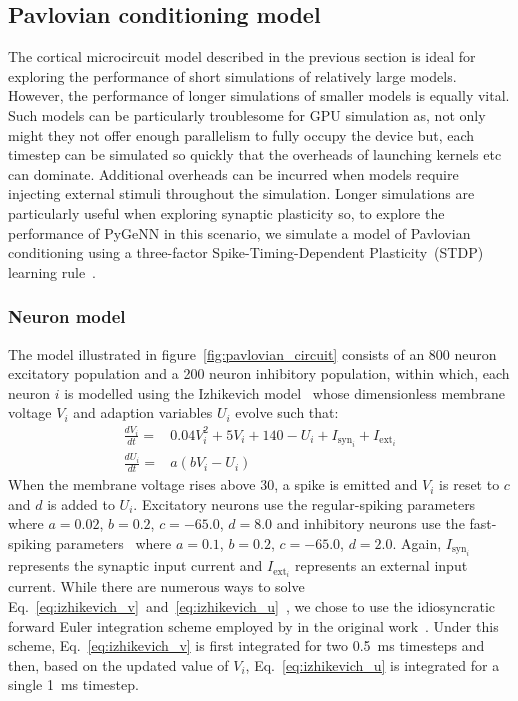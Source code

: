 \documentclass[utf8]{frontiersSCNS} %
\newcommand{\todo}[1]{\textbf{\textsc{\textcolor{red}{(TODO: #1)}}}}
\begin{document}
\subsection{Pavlovian conditioning model}
\label{sec:methods/izhikevich}
The cortical microcircuit model described in the previous section is ideal for exploring the performance of short simulations of relatively large models.
However, the performance of longer simulations of smaller models is equally vital.
Such models can be particularly troublesome for GPU simulation as, not only might they not offer enough parallelism to fully occupy the device but, each timestep can be simulated so quickly that the overheads of launching kernels etc can dominate.
Additional overheads can be incurred when models require injecting external stimuli throughout the simulation.
Longer simulations are particularly useful when exploring synaptic plasticity so, to explore the performance of PyGeNN in this scenario, we simulate a model of Pavlovian conditioning using a three-factor Spike-Timing-Dependent Plasticity~(STDP) learning rule~\citep{Izhikevich2007}.

\subsubsection{Neuron model}
The model illustrated in figure~\ref{fig:pavlovian_circuit} consists of an \num{800} neuron excitatory population and a \num{200} neuron inhibitory population, within which, each neuron $i$ is modelled using the Izhikevich model~\citep{Izhikevich2003a} whose dimensionless membrane voltage $V_{i}$ and adaption variables $U_i$ evolve such that:
%
\begin{align}
    \frac{dV_i}{dt} = & 0.04 V_i^2 + 5V_i + 140 - U_i + I_{\text{syn}_{i}} + I_{\text{ext}_{i}} \label{eq:izhikevich_v} \\
    \frac{dU_i}{dt} = & a(b V_i - U_i) \label{eq:izhikevich_u}
\end{align}
%
When the membrane voltage rises above 30, a spike is emitted and $V_i$ is reset to $c$ and $d$ is added to $U_i$.
Excitatory neurons use the regular-spiking parameters~\citep{Izhikevich2003a} where $a = 0.02$, $b = 0.2$, $c = -65.0$, $d = 8.0$ and inhibitory neurons use the fast-spiking parameters~\citep{Izhikevich2003a} where $a = 0.1$, $b = 0.2$, $c = -65.0$, $d = 2.0$.
Again, $I_{\text{syn}_{i}}$ represents the synaptic input current and $I_{\text{ext}_i}$ represents an external input current.
While there are numerous ways to solve Eq.~\ref{eq:izhikevich_v}~and~\ref{eq:izhikevich_u}~\citep{Humphries2007,Hopkins2015,Pauli2018}, we chose to use the idiosyncratic forward Euler integration scheme employed by \citet{Izhikevich2003a} in the original work~\citep{Izhikevich2007}.
Under this scheme, Eq.~\ref{eq:izhikevich_v} is first integrated for two \SI{0.5}{\milli\second} timesteps and then, based on the updated value of $V_i$, Eq.~\ref{eq:izhikevich_u} is integrated for a single \SI{1}{\milli\second} timestep.
\end{document}

